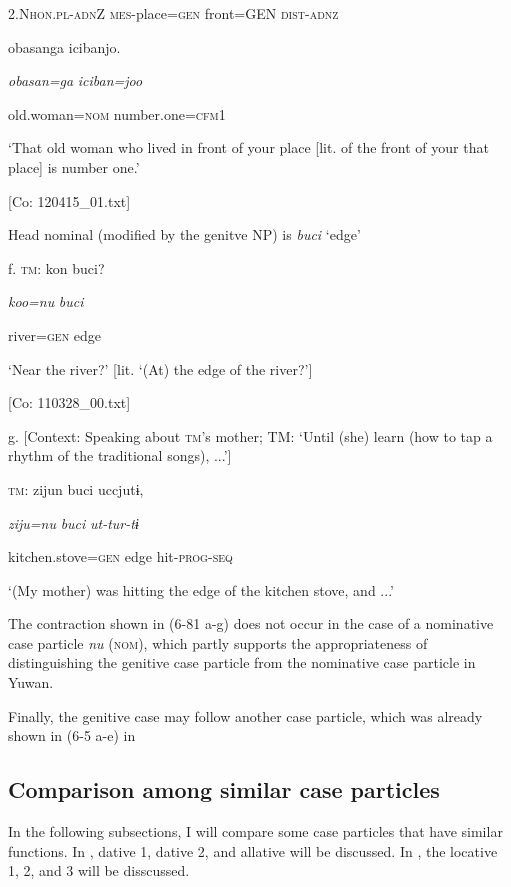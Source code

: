       2.N\textsc{hon}.\textsc{pl}-\textsc{adn}Z  \textsc{mes}-place=\textsc{gen}  front=GEN  \textsc{dist}-\textsc{adnz}

      {\textbar}obasan{\textbar}ga  {\textbar}iciban{\textbar}jo.

      \textit{obasan=ga}  \textit{iciban=joo}

      old.woman=\textsc{nom}  number.one=\textsc{cfm}1

      ‘That old woman who lived in front of your place [lit. of the front of your that place] is number one.’

      [Co: 120415\_01.txt]

  Head nominal (modified by the genitve NP) is \textit{buci} ‘edge’

  f.  \textsc{tm}:  kon  buci?

      \textit{koo=nu}  \textit{buci}

      river=\textsc{gen}  edge

      ‘Near the river?’ [lit. ‘(At) the edge of the river?’]

      [Co: 110328\_00.txt]

  g.  [Context: Speaking about \textsc{tm}’s mother; TM: ‘Until (she) learn (how to tap a rhythm of the traditional songs), ...’]

    \textsc{tm}:  zijun  buci  uccjutɨ,

      \textit{ziju=nu}  \textit{buci}  \textit{ut-tur-tɨ}

      kitchen.stove=\textsc{gen}  edge  hit-\textsc{prog}-\textsc{seq}

      ‘(My mother) was hitting the edge of the kitchen stove, and ...’

The contraction shown in (6-81 a-g) does not occur in the case of a nominative case particle \textit{nu} (\textsc{nom}), which partly supports the appropriateness of distinguishing the genitive case particle from the nominative case particle in Yuwan.

  Finally, the genitive case may follow another case particle, which was already shown in (6-5 a-e) in 

\subsection{Comparison among similar case particles}

In the following subsections, I will compare some case particles that have similar functions. In , dative 1, dative 2, and allative will be discussed. In , the locative 1, 2, and 3 will be disscussed.

